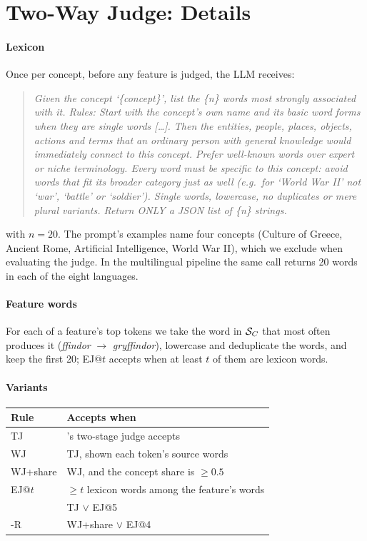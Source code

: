 \section{Two-Way Judge: Details}
\label{app:twj}

\paragraph{Lexicon}
Once per concept, before any feature is judged, the LLM receives:
\begin{quote}
\small\itshape
Given the concept `\{concept\}', list the \{n\} words most strongly associated with it. Rules: Start with the concept's own name and its basic word forms when they are single words [\dots]. Then the entities, people, places, objects, actions and terms that an ordinary person with general knowledge would immediately connect to this concept. Prefer well-known words over expert or niche terminology. Every word must be specific to this concept: avoid words that fit its broader category just as well (e.g.\ for `World War II' not `war', `battle' or `soldier'). Single words, lowercase, no duplicates or mere plural variants. Return ONLY a JSON list of \{n\} strings.
\end{quote}
with $n = 20$.
The prompt's examples name four concepts (Culture of Greece, Ancient Rome, Artificial Intelligence, World War II), which we exclude when evaluating the judge.
In the multilingual pipeline the same call returns 20 words in each of the eight languages.

\paragraph{Feature words}
For each of a feature's top tokens we take the word in $\mathcal{S}_C$ that most often produces it (\textit{ffindor} $\to$ \textit{gryffindor}), lowercase and deduplicate the words, and keep the first 20; EJ@$t$ accepts when at least $t$ of them are lexicon words.

\paragraph{Variants}

\begin{center}
\small
\setlength{\tabcolsep}{3pt}
\begin{tabular}{@{}lP{4.3cm}@{}}
\toprule
Rule & Accepts when \\
\midrule
TJ & \ember{}'s two-stage judge accepts \\
WJ & TJ, shown each token's source words \\
WJ+share & WJ, and the concept share is $\geq 0.5$ \\
EJ@$t$ & $\geq t$ lexicon words among the feature's words \\
\twj{} & TJ $\vee$ EJ@5 \\
\twj{}-R & WJ+share $\vee$ EJ@4 \\
\bottomrule
\end{tabular}
\end{center}

